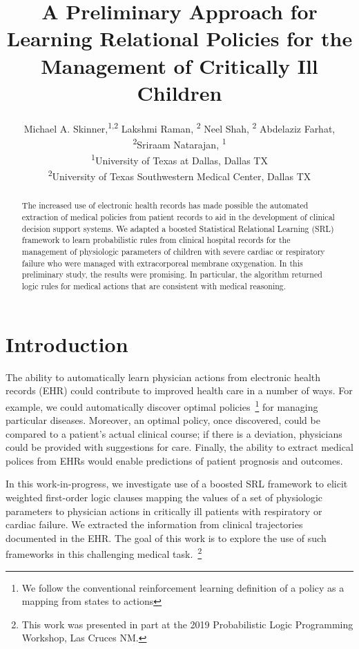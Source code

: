 \documentclass[letterpaper]{article}
\title{A Preliminary Approach for Learning Relational Policies for the Management of Critically Ill Children}
\author{Michael A. Skinner,\textsuperscript{\rm 1,2} Lakshmi Raman, \textsuperscript{\rm 2} Neel Shah, \textsuperscript{\rm 2} Abdelaziz Farhat, \textsuperscript{\rm 2}Sriraam Natarajan, \textsuperscript{\rm 1}\\ %
\textsuperscript{\rm 1}University of Texas at Dallas, Dallas TX\\
\textsuperscript{\rm 2}University of Texas Southwestern Medical Center, Dallas TX%
}
\begin{document}
\maketitle

\newcommand{\sn}[1]{\textcolor{Red}{[#1 \textsc{--Sriraam}]}}
\newcommand{\ms}[1]{\textcolor{Blue}{[#1 \textsc{--Mike}]}}
\begin{abstract}
The increased use of electronic health records has made possible the automated extraction of medical policies from patient records to aid in the development of clinical decision support systems. We adapted a boosted Statistical Relational Learning (SRL) framework to learn probabilistic rules from clinical hospital records for the management of physiologic parameters of children with severe cardiac or respiratory failure who were managed with extracorporeal membrane oxygenation. In this preliminary study, the results were promising. In particular, the algorithm returned logic rules for medical actions that are consistent with medical reasoning.

\end{abstract}
\section{Introduction}
The ability to automatically learn physician actions from electronic health records (EHR) could contribute to improved health care in a number of ways. For example, we could automatically discover optimal policies~\footnote{We follow the conventional reinforcement learning definition of a policy as a mapping from states to actions} for managing particular diseases. Moreover, an optimal policy, once discovered, could be compared to a patient's actual clinical course; if there is a deviation, physicians could be provided with suggestions for care. Finally, the ability to extract medical polices from EHRs would enable predictions of patient prognosis and outcomes.

In this work-in-progress, we investigate use of a boosted SRL framework to elicit weighted first-order logic clauses mapping the values of a set of physiologic parameters to physician actions in critically ill patients with respiratory or cardiac failure. We extracted the information from clinical trajectories documented in the EHR. The goal of this work is to explore the use of such frameworks in this challenging medical task.~\footnote{This work was presented in part at the 2019 Probabilistic Logic Programming Workshop, Las Cruces NM.}
\end{document}
